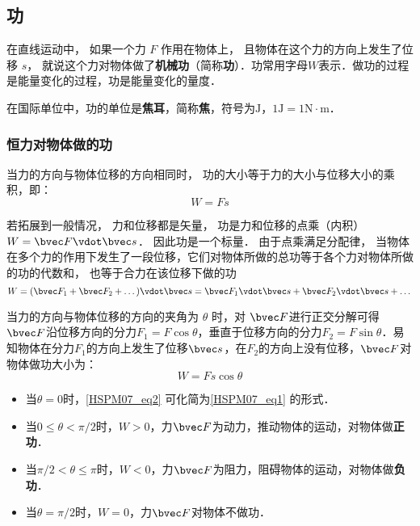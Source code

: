 

\subsection{功}

在直线运动中， 如果一个力 $F$ 作用在物体上， 且物体在这个力的方向上发生了位移 $s$， 就说这个力对物体做了\textbf{机械功}（简称\textbf{功}）．功常用字母$W$表示．做功的过程是能量变化的过程，功是能量变化的量度．

在国际单位中，功的单位是\textbf{焦耳}，简称\textbf{焦}，符号为$\mathrm{J}$，$1\mathrm{J}=1\mathrm{N \cdot m}$．

\subsubsection{恒力对物体做的功}

当力的方向与物体位移的方向相同时， 功的大小等于力的大小与位移大小的乘积，即：
\begin{equation}\label{HSPM07_eq1}
W=Fs
\end{equation}

若拓展到一般情况， 力和位移都是矢量， 功是力和位移的点乘（内积） $W = \bvec F \vdot \bvec s$． 因此功是一个标量． 由于点乘满足分配律， 当物体在多个力的作用下发生了一段位移，它们对物体所做的总功等于各个力对物体所做的功的代数和， 也等于合力在该位移下做的功
\begin{equation}
W = (\bvec F_1 + \bvec F_2 + \dots)\vdot \bvec s = \bvec F_1 \vdot \bvec s + \bvec F_2 \vdot \bvec s + \dots
\end{equation}

当力的方向与物体位移的方向的夹角为 $\theta$ 时，对 $\bvec F$进行正交分解可得$\bvec F$沿位移方向的分力$F_1=F\cos \theta$，垂直于位移方向的分力$F_2=F\sin \theta$．易知物体在分力$F_1$的方向上发生了位移$\bvec s$，在$F_2$的方向上没有位移，$\bvec F$对物体做功大小为：
\begin{equation}\label{HSPM07_eq2}
W=Fs\cos \theta
\end{equation}

\begin{itemize}
\item 当$\theta = 0$时，\autoref{HSPM07_eq2} 可化简为\autoref{HSPM07_eq1} 的形式．
\item 当$0\leq \theta < \pi/2$时，$W>0$，力$\bvec F$为动力，推动物体的运动，对物体做\textbf{正功}．
\item 当$\pi/2< \theta \leq \pi$时，$W<0$，力$\bvec F$为阻力，阻碍物体的运动，对物体做\textbf{负功}．
\item 当$\theta = \pi/2$时，$W=0$，力$\bvec F$对物体不做功．
\end{itemize}

